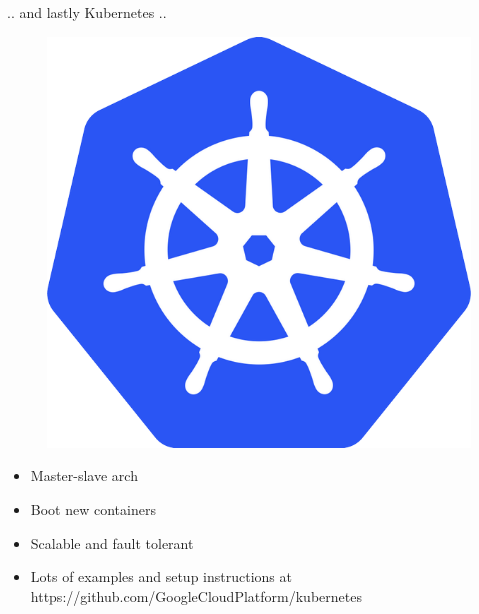 \documentclass{beamer}
\begin{document}
\begin{frame}{.. and lastly Kubernetes ..}
\begin{figure}[htp]
\centering
\includegraphics[scale=0.2]{kubernetes.png}
\label{}
\end{figure}
\begin{itemize}
  \item Master-slave arch
  \item Boot new containers
  \item Scalable and fault tolerant 
  \item Lots of examples and setup instructions at https://github.com/GoogleCloudPlatform/kubernetes
\end{itemize}
\end{frame}
\end{document}
